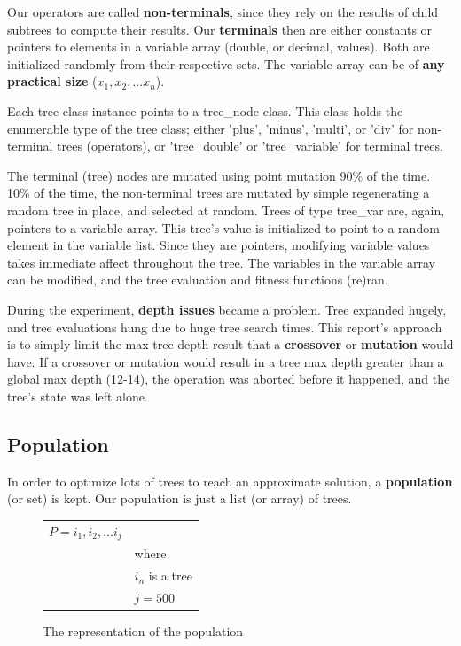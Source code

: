 \documentclass[12pt]{article}
\begin{document}
Our operators are called \textbf{non-terminals}, since they rely on the results of child subtrees to compute their results. Our \textbf{terminals} then are either constants or pointers to elements in a variable array (double, or decimal, values). Both are initialized randomly from their respective sets. The variable array can be of \textbf{any practical size} (${x_1, x_2, ... x_n}$).

Each tree class instance points to a tree\_node class. This class holds the enumerable type of the tree class; either 'plus', 'minus', 'multi', or 'div' for non-terminal trees (operators), or 'tree\_double' or 'tree\_variable' for terminal trees.

The terminal (tree) nodes are mutated using point mutation 90\% of the time. 10\% of the time, the non-terminal trees are mutated by simple regenerating a random tree in place, and selected at random. Trees of type tree\_var are, again, pointers to a variable array. This tree's value is initialized to point to a random element in the variable list. Since they are pointers, modifying variable values takes immediate affect throughout the tree. The variables in the variable array can be modified, and the tree evaluation and fitness functions (re)ran.

During the experiment, \textbf{depth issues} became a problem. Tree expanded hugely, and tree evaluations hung due to huge tree search times. This report's approach is to simply limit the max tree depth result that a \textbf{crossover} or \textbf{mutation} would have. If a crossover or mutation would result in a tree max depth greater than a global max depth (12-14), the operation was aborted before it happened, and the tree's state was left alone.

\subsection{Population}
\label{sec:population}
In order to optimize lots of trees to reach an approximate solution, a \textbf{population} (or set) is kept. Our population is just a list (or array) of trees. 

\begin{figure}[!h]
        \begin{center}
		\begin{tabular}{r l}
	                $ P = i_1, i_2, ... i_j $	& \\
								& where \\
								& $ i_n $ is a tree\\
								& $ j = 500 $ \\
		\end{tabular} 
               \caption{The representation of the population}
                \label{population}
        \end{center}
\end{figure}
\end{document}
